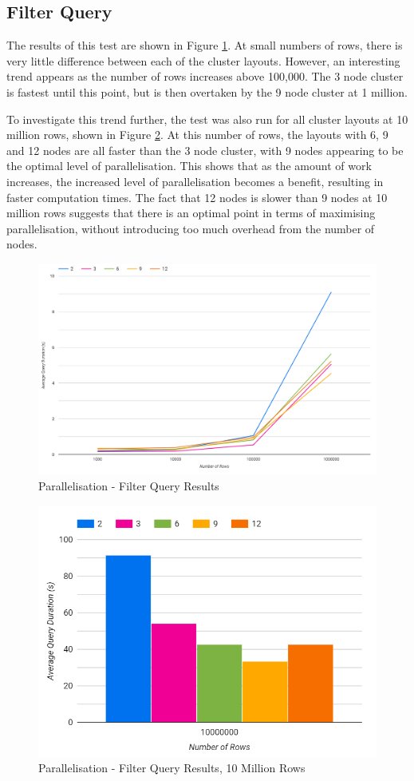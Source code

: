 \subsection{Filter Query}
The results of this test are shown in Figure \ref{fig:filter-simple-parallelisation-test}. At small numbers of rows, there is very little difference between each of the cluster layouts. However, an interesting trend appears as the number of rows increases above 100,000. The 3 node cluster is fastest until this point, but is then overtaken by the 9 node cluster at 1 million.

To investigate this trend further, the test was also run for all cluster layouts at 10 million rows, shown in Figure \ref{fig:filter-simple-parallelisation-10m}. At this number of rows, the layouts with 6, 9 and 12 nodes are all faster than the 3 node cluster, with 9 nodes appearing to be the optimal level of parallelisation. This shows that as the amount of work increases, the increased level of parallelisation becomes a benefit, resulting in faster computation times. The fact that 12 nodes is slower than 9 nodes at 10 million rows suggests that there is an optimal point in terms of maximising parallelisation, without introducing too much overhead from the number of nodes.

\begin{figure}[ht]
	\centering
	\includegraphics[width=0.8\linewidth]{chapters/diagrams/testing/filter-simple-parallelisation-test}
	\caption{Parallelisation - Filter Query Results}
	\label{fig:filter-simple-parallelisation-test}
\end{figure}

\begin{figure}[ht]
	\centering
	\includegraphics[width=0.4\linewidth]{chapters/diagrams/testing/filter-simple-parallelisation-10m}
	\caption{Parallelisation - Filter Query Results, 10 Million Rows}
	\label{fig:filter-simple-parallelisation-10m}
\end{figure}

